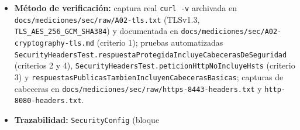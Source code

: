 \documentclass[
  spanish,
]{article}
\providecommand{\tightlist}{%
  \setlength{\itemsep}{0pt}\setlength{\parskip}{0pt}}
\begin{document}
\begin{itemize}
  \begin{enumerate}
  \def\labelenumi{\arabic{enumi}.}
  \tightlist
  \item
    Una conexión al puerto TLS negocia TLS 1.3 con una suite AEAD; la
    captura \texttt{curl\ -\allowbreak{}v} lo muestra explícitamente.
  \item
    Las respuestas servidas sobre HTTPS incluyen
    \texttt{Strict-\allowbreak{}Transport-\allowbreak{}Security:\ max-\allowbreak{}age=31536000;\allowbreak{}\ include\allowbreak{}Sub\allowbreak{}Domains;\allowbreak{}\ preload}.
  \item
    Las respuestas servidas sobre HTTP plano \textbf{no} incluyen la
    cabecera HSTS (evitando anunciarla sobre un canal no cifrado).
  \item
    Las respuestas incluyen además
    \texttt{X-\allowbreak{}Content-\allowbreak{}Type-\allowbreak{}Options:\ nosniff},
    \texttt{X-\allowbreak{}Frame-\allowbreak{}Options:\ DENY},
    \texttt{Referrer-\allowbreak{}Policy:\ no-\allowbreak{}referrer} y la política
    \texttt{Content-\allowbreak{}Security-\allowbreak{}Policy} configurada.
  \end{enumerate}
\item
  \textbf{Método de verificación:} captura real \texttt{curl\ -\allowbreak{}v}
  archivada en \texttt{docs/\allowbreak{}mediciones/\allowbreak{}sec/\allowbreak{}raw/\allowbreak{}A02-\allowbreak{}tls.\allowbreak{}txt} (TLSv1.3,
  \texttt{TLS\_\allowbreak{}AES\_\allowbreak{}256\_\allowbreak{}GCM\_\allowbreak{}SHA3\allowbreak{}84}) y documentada en
  \texttt{docs/\allowbreak{}mediciones/\allowbreak{}sec/\allowbreak{}A02-\allowbreak{}cryptography-\allowbreak{}tls.\allowbreak{}md} (criterio 1);
  pruebas automatizadas
  \texttt{Security\allowbreak{}Headers\allowbreak{}Test.\allowbreak{}respuesta\allowbreak{}Protegida\allowbreak{}Incluye\allowbreak{}Cabeceras\allowbreak{}De\allowbreak{}Seguridad}
  (criterios 2 y 4),
  \texttt{Security\allowbreak{}Headers\allowbreak{}Test.\allowbreak{}peticion\allowbreak{}Http\allowbreak{}No\allowbreak{}Incluye\allowbreak{}Hsts} (criterio 3) y
  \texttt{respuestas\allowbreak{}Publicas\allowbreak{}Tambien\allowbreak{}Incluyen\allowbreak{}Cabeceras\allowbreak{}Basicas}; capturas
  de cabeceras en
  \texttt{docs/\allowbreak{}mediciones/\allowbreak{}sec/\allowbreak{}raw/\allowbreak{}https-\allowbreak{}8443-\allowbreak{}headers.\allowbreak{}txt} y
  \texttt{http-\allowbreak{}8080-\allowbreak{}headers.\allowbreak{}txt}.
\item
  \textbf{Trazabilidad:} \texttt{Security\allowbreak{}Config} (bloque

\end{itemize}
\end{document}
